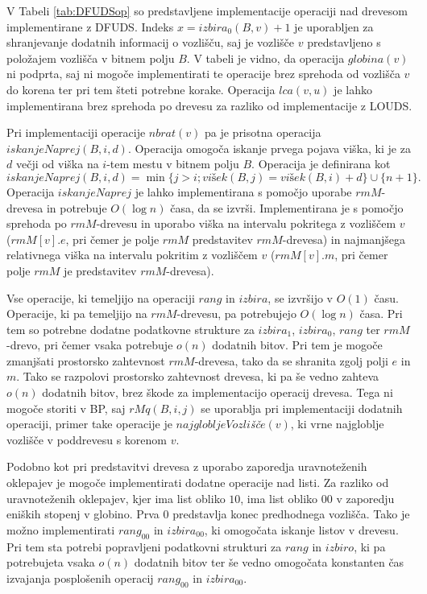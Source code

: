 V Tabeli \ref{tab:DFUDSop} so predstavljene implementacije operaciji nad drevesom implementirane z DFUDS. Indeks  $x=izbira_0(B,v)+1$ je uporabljen za shranjevanje dodatnih informacij o vozlišču, saj je vozlišče $v$ predstavljeno s položajem vozlišča v bitnem polju $B$. V tabeli je vidno, da operacija $globina(v)$ ni podprta, saj ni mogoče implementirati te operacije brez sprehoda od vozlišča $v$ do korena ter pri tem šteti potrebne korake. Operacija $lca(v,u)$ je lahko implementirana brez sprehoda po drevesu za razliko od implementacije z LOUDS.

Pri implementaciji operacije $nbrat(v)$ pa je prisotna operacija $iskanjeNaprej(B,i,d)$. Operacija omogoča iskanje prvega pojava viška, ki je za $d$ večji od viška na $i$-tem mestu v bitnem polju $B$. Operacija je definirana kot
$$
    iskanjeNaprej(B,i,d)=\min\{j>i; vi\textit{š}ek(B,j)=vi\textit{š}ek(B,i)+d\}\cup\{n+1\}.
$$
Operacija $iskanjeNaprej$ je lahko implementirana s pomočjo uporabe $rmM$-drevesa in potrebuje $O(\log{n})$ časa, da se izvrši. Implementirana je s pomočjo sprehoda po $rmM$-drevesu in uporabo viška na intervalu pokritega z vozliščem $v$ ($rmM[v].e$, pri čemer je polje $rmM$ predstavitev $rmM$-drevesa) in najmanjšega relativnega viška na intervalu pokritim z vozliščem $v$ ($rmM[v].m$, pri čemer polje $rmM$ je predstavitev $rmM$-drevesa).

Vse operacije, ki temeljijo na operaciji $rang$ in $izbira$, se izvršijo v $O(1)$ času. Operacije, ki pa temeljijo na $rmM$-drevesu, pa potrebujejo $O(\log{n})$ časa. Pri tem so potrebne dodatne podatkovne strukture za $izbira_1$, $izbira_0$, $rang$ ter $rmM$-drevo, pri čemer vsaka potrebuje $o(n)$ dodatnih bitov. Pri tem je mogoče zmanjšati prostorsko zahtevnost $rmM$-drevesa, tako da se shranita zgolj polji $e$ in $m$. Tako se razpolovi prostorsko zahtevnost drevesa, ki pa še vedno zahteva $o(n)$ dodatnih bitov, brez škode za implementacijo operacij drevesa. Tega ni mogoče storiti v BP, saj $rMq(B,i,j)$ se uporablja pri implementaciji dodatnih operaciji, primer take operacije je $najglobljeVozli$\textit{šč}$e(v)$, ki vrne najgloblje vozlišče v poddrevesu s korenom $v$.

Podobno kot pri predstavitvi drevesa z uporabo zaporedja uravnoteženih oklepajev je mogoče implementirati dodatne operacije nad listi. Za razliko od uravnoteženih oklepajev, kjer ima list obliko $10$, ima list obliko $00$ v zaporedju eniških stopenj v globino. Prva $0$ predstavlja konec predhodnega vozlišča. Tako je možno implementirati $rang_{00}$ in $izbira_{00}$, ki omogočata iskanje listov v drevesu. Pri tem sta potrebi popravljeni podatkovni strukturi za $rang$ in $izbiro$, ki pa potrebujeta vsaka $o(n)$ dodatnih bitov ter  še vedno omogočata konstanten čas izvajanja posplošenih operacij $rang_{00}$ in $izbira_{00}$.  

